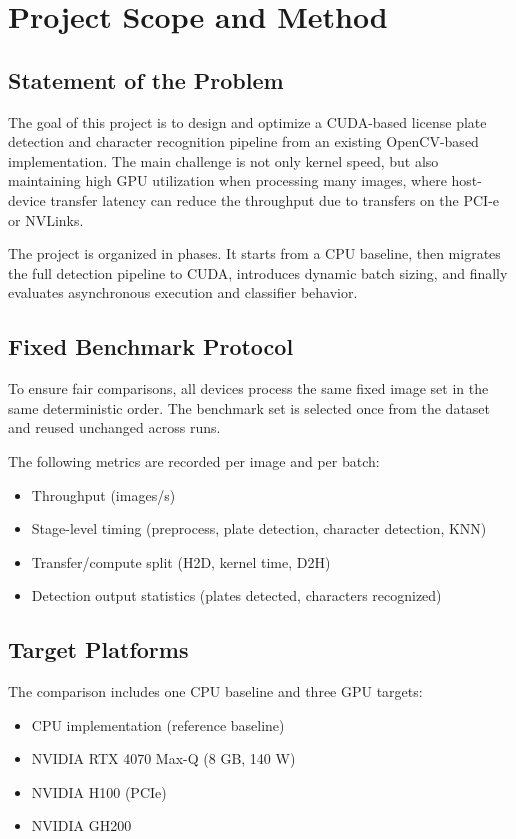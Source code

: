 \section{Project Scope and Method}

\subsection{Statement of the Problem}
The goal of this project is to design and optimize a CUDA-based license plate detection and character recognition pipeline from an existing OpenCV-based implementation. 
The main challenge is not only kernel speed, but also maintaining high GPU utilization when processing many images, where host-device transfer latency can reduce the throughput due to transfers on the PCI-e or NVLinks.

The project is organized in phases. It starts from a CPU baseline, then migrates the full detection pipeline to CUDA, introduces dynamic batch sizing, and finally evaluates asynchronous execution and classifier behavior.

\subsection{Fixed Benchmark Protocol}
To ensure fair comparisons, all devices process the same fixed image set in the same deterministic order. The benchmark set is selected once from the dataset and reused unchanged across runs.

The following metrics are recorded per image and per batch:
\begin{itemize}
    \item Throughput (images/s)
    \item Stage-level timing (preprocess, plate detection, character detection, KNN)
    \item Transfer/compute split (H2D, kernel time, D2H)
    \item Detection output statistics (plates detected, characters recognized)
\end{itemize}

\subsection{Target Platforms}
The comparison includes one CPU baseline and three GPU targets:
\begin{itemize}
    \item CPU implementation (reference baseline)
    \item NVIDIA RTX 4070 Max-Q (8 GB, 140 W)
    \item NVIDIA H100 (PCIe)
    \item NVIDIA GH200
\end{itemize}


